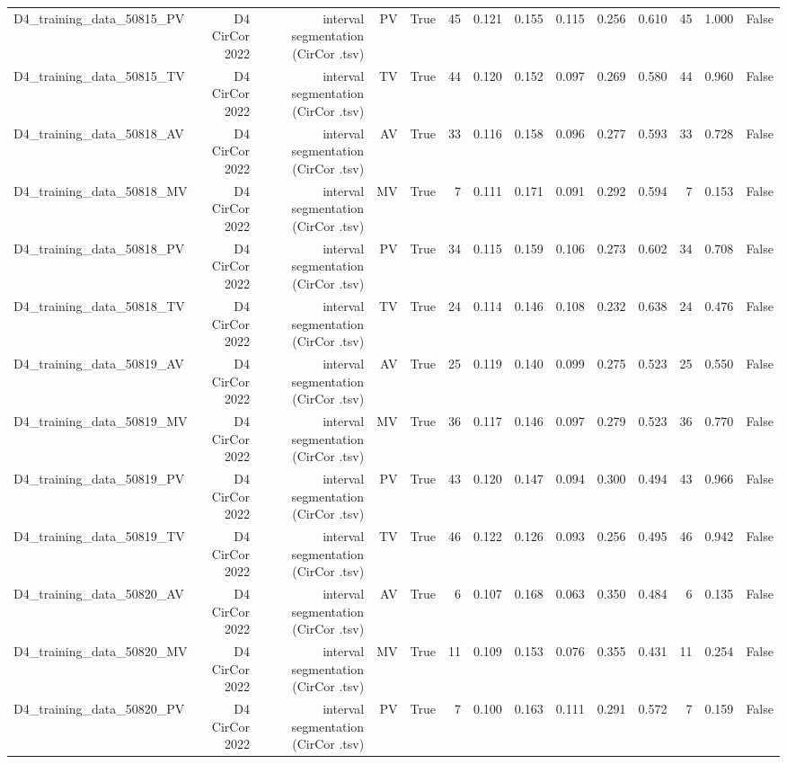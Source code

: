 \begin{table}[htbp]
\begin{tabular}{lrrrrrrrrrrrrr}
    D4\_training\_data\_50815\_PV & D4 CirCor 2022 & interval segmentation (CirCor .tsv) & PV & True & 45 & 0.121 & 0.155 & 0.115 & 0.256 & 0.610 & 45 & 1.000 & False \\
    D4\_training\_data\_50815\_TV & D4 CirCor 2022 & interval segmentation (CirCor .tsv) & TV & True & 44 & 0.120 & 0.152 & 0.097 & 0.269 & 0.580 & 44 & 0.960 & False \\
    D4\_training\_data\_50818\_AV & D4 CirCor 2022 & interval segmentation (CirCor .tsv) & AV & True & 33 & 0.116 & 0.158 & 0.096 & 0.277 & 0.593 & 33 & 0.728 & False \\
    D4\_training\_data\_50818\_MV & D4 CirCor 2022 & interval segmentation (CirCor .tsv) & MV & True & 7 & 0.111 & 0.171 & 0.091 & 0.292 & 0.594 & 7 & 0.153 & False \\
    D4\_training\_data\_50818\_PV & D4 CirCor 2022 & interval segmentation (CirCor .tsv) & PV & True & 34 & 0.115 & 0.159 & 0.106 & 0.273 & 0.602 & 34 & 0.708 & False \\
    D4\_training\_data\_50818\_TV & D4 CirCor 2022 & interval segmentation (CirCor .tsv) & TV & True & 24 & 0.114 & 0.146 & 0.108 & 0.232 & 0.638 & 24 & 0.476 & False \\
    D4\_training\_data\_50819\_AV & D4 CirCor 2022 & interval segmentation (CirCor .tsv) & AV & True & 25 & 0.119 & 0.140 & 0.099 & 0.275 & 0.523 & 25 & 0.550 & False \\
    D4\_training\_data\_50819\_MV & D4 CirCor 2022 & interval segmentation (CirCor .tsv) & MV & True & 36 & 0.117 & 0.146 & 0.097 & 0.279 & 0.523 & 36 & 0.770 & False \\
    D4\_training\_data\_50819\_PV & D4 CirCor 2022 & interval segmentation (CirCor .tsv) & PV & True & 43 & 0.120 & 0.147 & 0.094 & 0.300 & 0.494 & 43 & 0.966 & False \\
    D4\_training\_data\_50819\_TV & D4 CirCor 2022 & interval segmentation (CirCor .tsv) & TV & True & 46 & 0.122 & 0.126 & 0.093 & 0.256 & 0.495 & 46 & 0.942 & False \\
    D4\_training\_data\_50820\_AV & D4 CirCor 2022 & interval segmentation (CirCor .tsv) & AV & True & 6 & 0.107 & 0.168 & 0.063 & 0.350 & 0.484 & 6 & 0.135 & False \\
    D4\_training\_data\_50820\_MV & D4 CirCor 2022 & interval segmentation (CirCor .tsv) & MV & True & 11 & 0.109 & 0.153 & 0.076 & 0.355 & 0.431 & 11 & 0.254 & False \\
    D4\_training\_data\_50820\_PV & D4 CirCor 2022 & interval segmentation (CirCor .tsv) & PV & True & 7 & 0.100 & 0.163 & 0.111 & 0.291 & 0.572 & 7 & 0.159 & False \\

\end{tabular}
\end{table}
